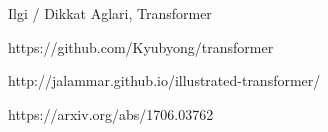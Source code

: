 \documentclass[12pt,fleqn]{article}\usepackage{../../common}
\begin{document}
Ilgi / Dikkat Aglari, Transformer



https://github.com/Kyubyong/transformer

http://jalammar.github.io/illustrated-transformer/

https://arxiv.org/abs/1706.03762
\end{document}
